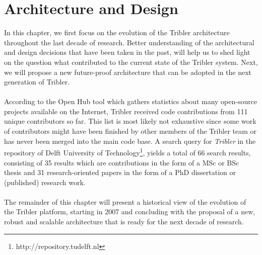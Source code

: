 \chapter{Architecture and Design}
\label{chapter:architecture}

In this chapter, we first focus on the evolution of the Tribler architecture throughout the last decade of research. Better understanding of the architectural and design decisions that have been taken in the past, will help us to shed light on the question what contributed to the current state of the Tribler system. Next, we will propose a new future-proof architecture that can be adopted in the next generation of Tribler.\\\\
According to the Open Hub tool\cite{openhubtribler} which gathers statistics about many open-source projects available on the Internet, Tribler received code contributions from 111 unique contributors so far. This list is most likely not exhaustive since some work of contributors might have been finished by other members of the Tribler team or has never been merged into the main code base. A search query for \emph{Tribler} in the repository of Delft University of Technology\footnote{http://repository.tudelft.nl}, yields a total of 66 search results, consisting of 35 results which are contributions in the form of a MSc or BSc thesis and 31 research-oriented papers in the form of a PhD dissertation or (published) research work.\\\\
The remainder of this chapter will present a historical view of the evolution of the Tribler platform, starting in 2007 and concluding with the proposal of a new, robust and scalable architecture that is ready for the next decade of research.

